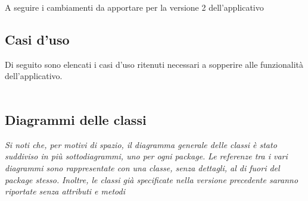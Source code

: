 A seguire i cambiamenti da apportare per la versione 2 dell'applicativo

\subsection{Casi d'uso}
Di seguito sono elencati i casi d'uso ritenuti necessari a sopperire alle funzionalità
dell'applicativo.
\\\\





\pagebreak


\pagebreak
\subsection{Diagrammi delle classi}

\textit{Si noti che, per motivi di spazio, il diagramma generale delle classi è stato suddiviso in più sottodiagrammi, uno per ogni package.}
\textit{Le referenze tra i vari diagrammi sono rappresentate con una classe, senza dettagli, al di fuori del package stesso.}
\textit{Inoltre, le classi già specificate nella versione precedente saranno riportate senza attributi e metodi}



